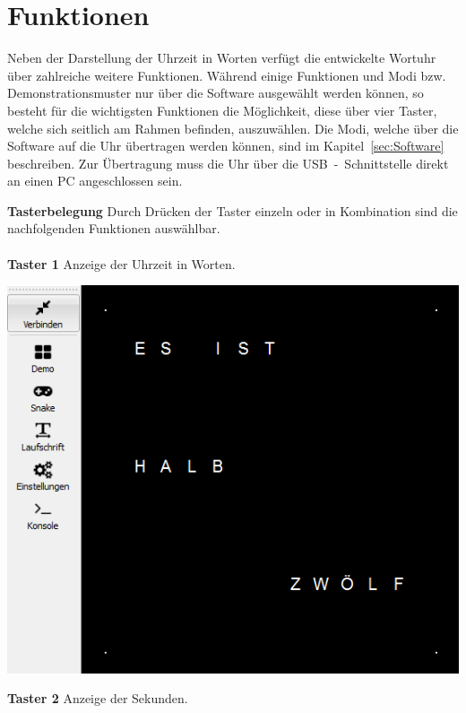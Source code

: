
\section{Funktionen}
\label{sec:Funktionen}

\begin{multicols}{2}

Neben der Darstellung der Uhrzeit in Worten verfügt die entwickelte Wortuhr über zahlreiche weitere Funktionen. Während einige Funktionen und Modi bzw. Demonstrationsmuster nur über die Software ausgewählt werden können, so besteht für die wichtigsten Funktionen die Möglichkeit, diese über vier Taster, welche sich seitlich am Rahmen befinden, auszuwählen. Die Modi, welche über die Software auf die Uhr übertragen werden können, sind im Kapitel~\ref{sec:Software} beschreiben. Zur Übertragung muss die Uhr über die USB~-~Schnittstelle direkt an einen PC angeschlossen sein. 

 \textbf{Tasterbelegung} Durch Drücken der Taster einzeln oder in Kombination sind die nachfolgenden Funktionen auswählbar.  \\ \\
\textbf{Taster 1} Anzeige der Uhrzeit in Worten.

{
\centering
\includegraphics[width=0.8\columnwidth]{Abbildungen/Funktionen/Uhrzeit_01}

}

\textbf{Taster 2} Anzeige der Sekunden.


\end{multicols}
